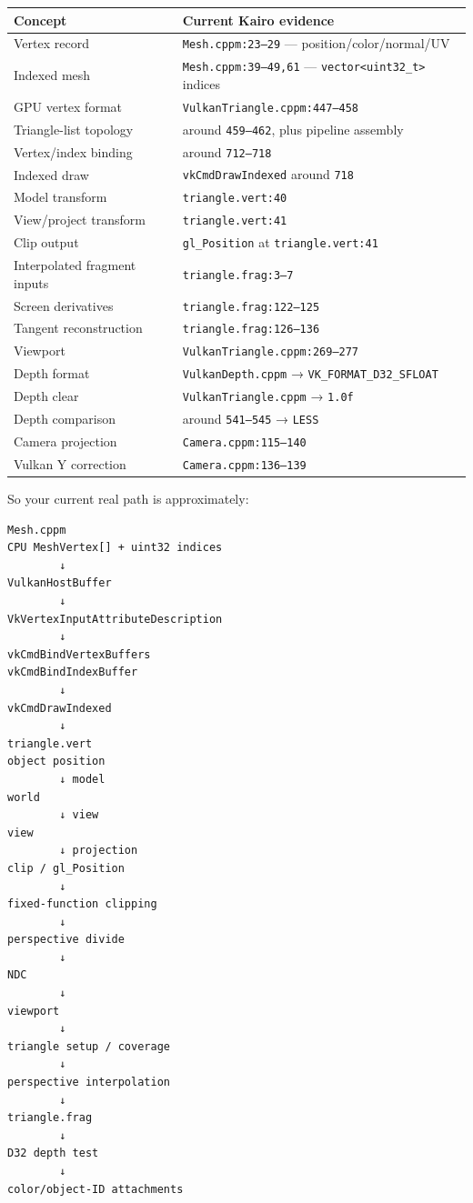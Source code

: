 {\def\LTcaptype{none} %
\begin{longtable}[]{@{}ll@{}}
\toprule\noalign{}
Concept & Current Kairo evidence \\
\midrule\noalign{}
\endhead
\bottomrule\noalign{}
\endlastfoot
Vertex record & \texttt{Mesh.cppm:23–29} --- position/color/normal/UV \\
Indexed mesh & \texttt{Mesh.cppm:39–49,61} --- \texttt{vector\textless{}uint32\_t\textgreater{}} indices \\
GPU vertex format & \texttt{VulkanTriangle.cppm:447–458} \\
Triangle-list topology & around \texttt{459–462}, plus pipeline assembly \\
Vertex/index binding & around \texttt{712–718} \\
Indexed draw & \texttt{vkCmdDrawIndexed} around \texttt{718} \\
Model transform & \texttt{triangle.vert:40} \\
View/project transform & \texttt{triangle.vert:41} \\
Clip output & \texttt{gl\_Position} at \texttt{triangle.vert:41} \\
Interpolated fragment inputs & \texttt{triangle.frag:3–7} \\
Screen derivatives & \texttt{triangle.frag:122–125} \\
Tangent reconstruction & \texttt{triangle.frag:126–136} \\
Viewport & \texttt{VulkanTriangle.cppm:269–277} \\
Depth format & \texttt{VulkanDepth.cppm} → \texttt{VK\_FORMAT\_D32\_SFLOAT} \\
Depth clear & \texttt{VulkanTriangle.cppm} → \texttt{1.0f} \\
Depth comparison & around \texttt{541–545} → \texttt{LESS} \\
Camera projection & \texttt{Camera.cppm:115–140} \\
Vulkan Y correction & \texttt{Camera.cppm:136–139} \\
\end{longtable}
}

So your current real path is approximately:

\begin{verbatim}
Mesh.cppm
CPU MeshVertex[] + uint32 indices
        ↓
VulkanHostBuffer
        ↓
VkVertexInputAttributeDescription
        ↓
vkCmdBindVertexBuffers
vkCmdBindIndexBuffer
        ↓
vkCmdDrawIndexed
        ↓
triangle.vert
object position
        ↓ model
world
        ↓ view
view
        ↓ projection
clip / gl_Position
        ↓
fixed-function clipping
        ↓
perspective divide
        ↓
NDC
        ↓
viewport
        ↓
triangle setup / coverage
        ↓
perspective interpolation
        ↓
triangle.frag
        ↓
D32 depth test
        ↓
color/object-ID attachments
\end{verbatim}

